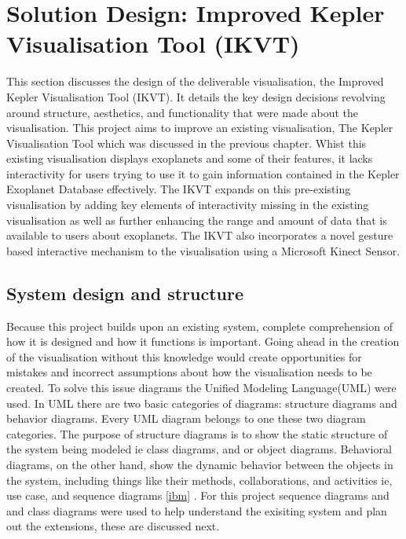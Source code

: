 \chapter{Solution Design: Improved Kepler Visualisation Tool (IKVT)}\label{C:sd}
This section discusses the design of the deliverable visualisation, the Improved
Kepler Visualisation Tool (IKVT). It details
the key design decisions revolving around structure, aesthetics, and
functionality that were made about the visualisation. 
This project aims to improve an existing visualisation, The Kepler Visualisation
Tool which was discussed in the previous chapter. Whist this existing
visualisation displays exoplanets and some of their features, it lacks
interactivity for users trying to use it to gain information contained in the
Kepler Exoplanet Database effectively. The IKVT expands on this pre-existing
visualisation by adding key elements of interactivity missing in the existing
 visualisation as well as further enhancing the range and amount of data that
is available to users about exoplanets. The IKVT also incorporates a novel
gesture based interactive mechanism to the visualisation using a Microsoft
Kinect Sensor.

\section{System design and structure}
Because this project builds upon an existing system, complete comprehension of
how it is designed and how it functions is important. Going ahead in the
creation of the visualisation without this knowledge would create opportunities
for mistakes and incorrect assumptions about how the visualisation needs to be
created. To solve this issue diagrams the Unified Modeling Language(UML) were
used. In UML there are two basic categories of diagrams: structure diagrams and
behavior diagrams. Every UML diagram belongs to one these two diagram
categories. The purpose of structure diagrams is to show the static structure of
the system being modeled ie class diagrams, and or object diagrams. Behavioral
diagrams, on the other hand, show the dynamic behavior between the objects in
the system, including things like their methods, collaborations, and activities
ie, use case, and sequence diagrams \ref{ibm}
. For this project sequence diagrams and and class diagrams were used to help
understand the exisiting system and plan out the extensions, these are discussed
next.

